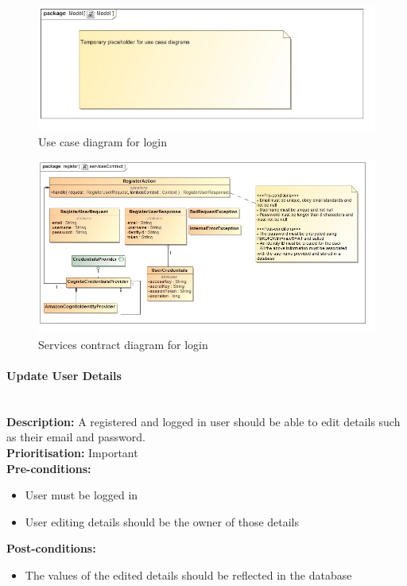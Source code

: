 \documentclass{article}
\begin{document}
		\begin{figure}[H]
			\includegraphics[width=\linewidth]{images/tempUseCase.jpg}
			\caption{Use case diagram for login}
		\end{figure}		
		
		\begin{figure}[H]
			\includegraphics[width=\linewidth]{images/ServicesContracts/login.jpg}
			\caption{Services contract diagram for login}
		\end{figure}
		
	\paragraph{Update User Details}\mbox{}\\
		\textbf{Description:} A registered and logged in user should be able to edit details such as their email and password.\\
		\textbf{Prioritisation:} Important\\		
		\textbf{Pre-conditions:}
			\begin{itemize}
				\item User must be logged in
				\item User editing details should be the owner of those details
			\end{itemize}
		\textbf{Post-conditions:}
			\begin{itemize}
				\item The values of the edited details should be reflected in the database
			\end{itemize}
\end{document}
